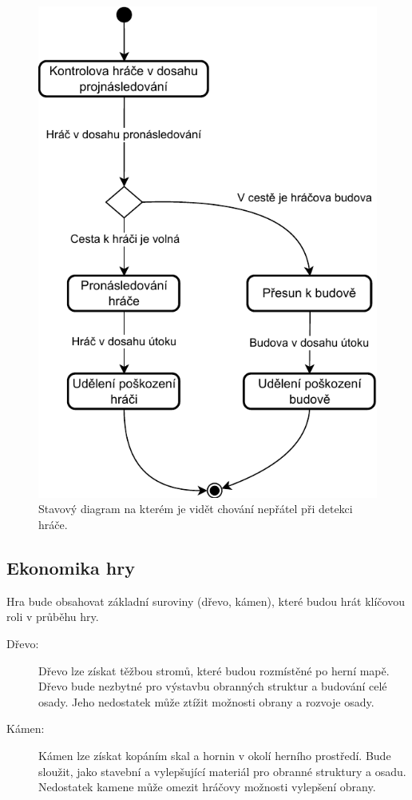 \begin{figure}[H]
	\centering
	\includegraphics[scale=1]{obrazky-figures/EnemyStateDiagram.pdf}
	\caption{Stavový diagram na kterém je vidět chování nepřátel při detekci hráče.}
	\label{EnemyStateDiagram}
\end{figure}

\subsection{Ekonomika hry}
Hra bude obsahovat základní suroviny (dřevo, kámen), které budou hrát klíčovou roli v průběhu hry.

\begin{description}
	\item[Dřevo:] Dřevo lze získat těžbou stromů, které budou rozmístěné po herní mapě. Dřevo bude nezbytné pro výstavbu obranných struktur a budování celé osady. Jeho nedostatek může ztížit možnosti obrany a rozvoje osady.
	\item[Kámen:] Kámen lze získat kopáním skal a hornin v okolí herního prostředí. Bude sloužit, jako stavební a vylepšující materiál pro obranné struktury a osadu. Nedostatek kamene může omezit hráčovy možnosti vylepšení obrany.
\end{description}

